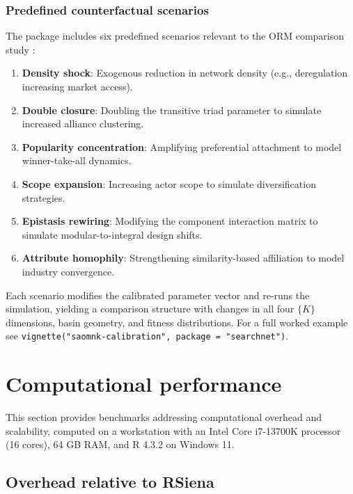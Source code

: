 \documentclass[
]{article}
\begin{document}
\subsubsection{Predefined counterfactual
scenarios}\label{predefined-counterfactual-scenarios}

The package includes six predefined scenarios relevant to the ORM
comparison study \citep{downing2026architecture}:

\begin{enumerate}
\item \textbf{Density shock}: Exogenous reduction in network density
  (e.g., deregulation increasing market access).
\item \textbf{Double closure}: Doubling the transitive triad parameter to
  simulate increased alliance clustering.
\item \textbf{Popularity concentration}: Amplifying preferential attachment
  to model winner-take-all dynamics.
\item \textbf{Scope expansion}: Increasing actor scope to simulate
  diversification strategies.
\item \textbf{Epistasis rewiring}: Modifying the component interaction
  matrix to simulate modular-to-integral design shifts.
\item \textbf{Attribute homophily}: Strengthening similarity-based
  affiliation to model industry convergence.
\end{enumerate}

\noindent Each scenario modifies the calibrated parameter vector and
re-runs the simulation, yielding a comparison structure with changes in
all four \(\{K\}\) dimensions, basin geometry, and fitness
distributions. For a full worked example see
\texttt{vignette("saomnk-calibration", package =
"searchnet")}.

\section{Computational performance}\label{sec:performance}

This section provides benchmarks addressing computational overhead and
scalability, computed on a workstation with an Intel Core i7-13700K
processor (16 cores), 64 GB RAM, and \textsf{R} 4.3.2 on Windows 11.

\subsection{\texorpdfstring{Overhead relative to
\textbf{RSiena}}{Overhead relative to }}\label{overhead-relative-to}
\end{document}
